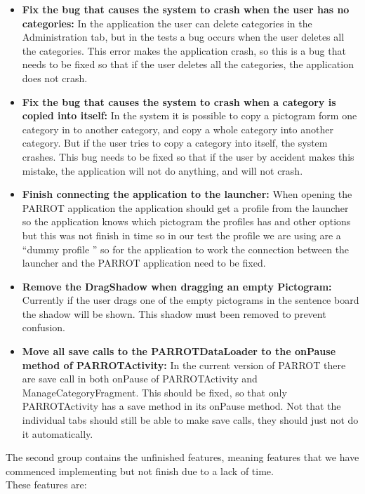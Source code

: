 \begin{itemize}
	\item \textbf{Fix the bug that causes the system to crash when the user has no categories:} In the application the user can delete 						categories in the Administration tab, but in the tests a bug occurs when the user deletes all the categories. This error makes 					the application crash, so this is a bug that needs to be fixed so that if the user deletes all the categories, the application 					does not crash.
	
	\item \textbf{Fix the bug that causes the system to crash when a category is copied into itself:} In the system it is possible to 						copy a pictogram form one category in to another	category, and copy a whole category into another category. But if the user 						tries to copy a category into itself, the system crashes. This bug needs to be fixed so that if the user by accident makes this 				mistake, the application will not do anything, and will not crash. 
	
	\item \textbf{Finish connecting the application to the launcher:} When opening the PARROT application the application should get a 						profile from the launcher so the application knows which pictogram the profiles has and other options but this was not finish 					in time so in our test the profile we are using are a ``dummy profile '' so for the application to work the connection between 					the launcher and the PARROT application need to be fixed. 
	
	\item \textbf{Remove the DragShadow when dragging an empty Pictogram:} Currently if the user drags one of the empty pictograms in the 				sentence board the shadow will be shown. This shadow must been removed to prevent confusion.
	
	\item \textbf{Move all save calls to the PARROTDataLoader to the onPause method of PARROTActivity:} In the current version of PARROT there are save call in both onPause of PARROTActivity and ManageCategoryFragment. This should be fixed, so that only PARROTActivity has a save method in its onPause method. Not that the individual tabs should still be able to make save calls, they should just not do it automatically.
\end{itemize}
  
The second group contains the unfinished features, meaning features that we have commenced implementing but not finish due to a lack of time.   
\\
These features are:


